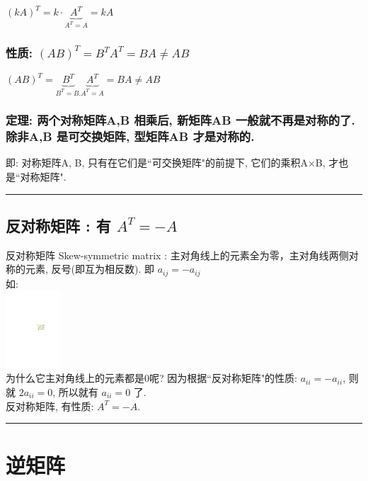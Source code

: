 \documentclass[UTF8]{ctexart}
\begin{document}
$
\left( kA \right) ^T=k\cdot \underset{A^T=A}{\underbrace{A^T}}=kA
$


\subsubsection{性质: $\left( AB \right) ^T=B^TA^T=BA\ne AB$ }

$
\left( AB \right) ^T=\underset{B^T=B.}{\underbrace{B^T}}\underset{A^T=A}{\underbrace{A^T}}=BA\ne AB
$


\subsubsection{定理: 两个对称矩阵A,B 相乘后, 新矩阵AB 一般就不再是对称的了. 除非A,B 是可交换矩阵, 型矩阵AB 才是对称的.}

即: 对称矩阵A, B, 只有在它们是``可交换矩阵"的前提下, 它们的乘积A×B, 才也是``对称矩阵". \\


\hrule


\subsection{反对称矩阵 : 有 $A^T = - A$}

反对称矩阵 Skew-symmetric matrix : 主对角线上的元素全为零，主对角线两侧对称的元素, 反号(即互为相反数). 即 $a_{ij}= -a_{ij}$ \\

如: \\
\includegraphics[width=0.15\textwidth]{img/0023.pdf} \\

为什么它主对角线上的元素都是0呢? 因为根据``反对称矩阵"的性质: $a_{ii}= -a_{ii}$, 则就 $2a_{ii}=0$, 所以就有 $a_{ii}=0$ 了. \\

反对称矩阵, 有性质: $A^T = - A$.\\


\hrule


\section{逆矩阵}
\end{document}
